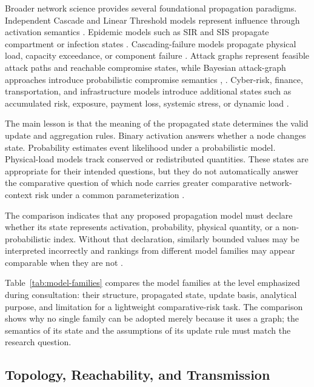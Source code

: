 Broader network science provides several foundational propagation
paradigms. Independent Cascade and Linear Threshold models represent
influence through activation semantics \citep{kempe2003}. Epidemic models such as
SIR and SIS propagate compartment or infection states \citep{kermack1927,pastor2001,humphries2021}.
Cascading-failure models propagate physical load, capacity exceedance,
or component failure \citep{buldyrev2010,he2019,shuang2017}. Attack graphs represent feasible
attack paths and reachable compromise states, while Bayesian
attack-graph approaches introduce probabilistic compromise semantics
\citep{sheyner2002}, \citep{munoz2017}. Cyber-risk, finance, transportation, and
infrastructure models introduce additional states such as accumulated
risk, exposure, payment loss, systemic stress, or dynamic load
\citep{kavallieratos2021,faraji2026,zhou2023,wu2026,petrone2018}.

The main lesson is that the meaning of the propagated state determines
the valid update and aggregation rules. Binary activation answers
whether a node changes state. Probability estimates event likelihood
under a probabilistic model. Physical-load models track conserved or
redistributed quantities. These states are appropriate for their
intended questions, but they do not automatically answer the comparative
question of which node carries greater comparative network-context risk
under a common parameterization \citep{kempe2003,kermack1927,buldyrev2010,
sheyner2002,kavallieratos2021}.

The comparison indicates that any proposed propagation model must declare
whether its state represents activation, probability, physical quantity,
or a non-probabilistic index. Without that declaration, similarly bounded
values may be interpreted incorrectly and rankings from different model
families may appear comparable when they are not \citep{kempe2003,
kermack1927,munoz2017,petrone2018}.

Table~\ref{tab:model-families} compares the model families at the level
emphasized during consultation: their structure, propagated state,
update basis, analytical purpose, and limitation for a lightweight
comparative-risk task. The comparison shows why no single family can be
adopted merely because it uses a graph; the semantics of its state and
the assumptions of its update rule must match the research question.



\subsection{Topology, Reachability, and
Transmission}\label{topology-reachability-and-transmission}

